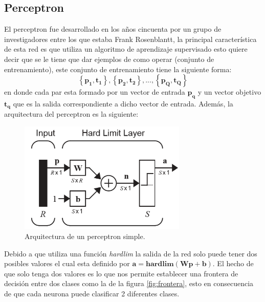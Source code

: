         \subsection{Perceptron}
        El perceptron fue desarrollado en los años cincuenta por un grupo de investigadores entre los que estaba Frank Rosenblantt, la principal característica de esta red es que utiliza un algoritmo de aprendizaje supervisado esto quiere decir que se le tiene que dar ejemplos de como operar (conjunto de entrenamiento), este conjunto de entrenamiento tiene la siguiente forma:
        \[ \left\lbrace \boldsymbol{p_1, t_1}\right\rbrace , \left\lbrace \boldsymbol{p_2, t_2}\right\rbrace , ... , \left\lbrace \boldsymbol{p_Q, t_Q}\right\rbrace  \]
        en donde cada par esta formado por un vector de entrada $\boldsymbol{p_q}$ y un vector objetivo $\boldsymbol{t_q}$ que es la salida correspondiente a dicho vector de entrada. \cite{libro1}
        Además, la arquitectura del perceptron es la siguiente:
        \begin{figure}[H]
            \begin{center}
                \includegraphics[width=8cm]{img/perceptron/perceptron.png}
                \caption{Arquitectura de un perceptron simple. \cite{libro1}}
                \label{fig:perpectron-diagrama}
            \end{center}
        \end{figure}
        Debido a que utiliza una función \emph{hardlim} la salida de la red solo puede tener dos posibles valores el cual esta definido por $\boldsymbol{a = hardlim(Wp+b)}$. El hecho de que solo tenga dos valores es lo que nos permite establecer una frontera de decisión entre dos clases como la de la figura \ref{fig:frontera}, esto en consecuencia de que cada neurona puede clasificar 2 diferentes clases.
